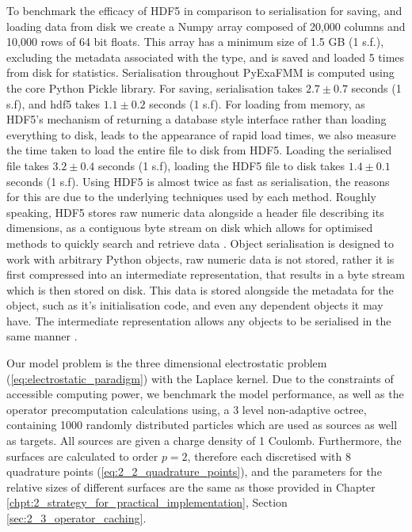 To benchmark the efficacy of HDF5 in comparison to serialisation for saving,
and loading data from disk we create a Numpy array composed of
20,000 columns and 10,000 rows of 64 bit floats. This array has a minimum size
of 1.5 GB (1 s.f.), excluding the metadata associated with the type, and is
saved and loaded 5 times from disk for statistics. Serialisation throughout
\gls{PyExaFMM} is computed using the core Python Pickle library. For saving,
serialisation takes $2.7 \pm 0.7$ seconds (1 s.f), and hdf5 takes $1.1 ± 0.2$ seconds (1 s.f).
For loading from memory, as HDF5's mechanism of returning a database style interface
rather than loading everything to disk, leads to the appearance of rapid
load times, we also measure the time taken to load the entire file to disk from
HDF5. Loading the serialised file takes $3.2 \pm 0.4$ seconds (1 s.f), loading
the HDF5 file to disk takes $1.4 \pm 0.1$ seconds (1 s.f). Using HDF5 is almost
twice as fast as serialisation, the reasons for this are due to the underlying
techniques used by each method. Roughly speaking, HDF5 stores raw numeric data
alongside a header file describing its dimensions, as a contiguous byte stream
on disk which allows for optimised methods to quickly search and retrieve data
\cite{collette2013python}. Object serialisation is designed to work with arbitrary
Python objects, raw numeric data is not stored, rather it is first compressed
into an intermediate representation, that results in a byte stream which is then
stored on disk. This data is stored alongside the metadata for the object, such
as it's initialisation code, and even any dependent objects it may have. The
intermediate representation allows any objects to be serialised in the same
manner \cite{pickle}.

Our model problem is the three dimensional electrostatic problem (\ref{eq:electrostatic_paradigm})
with the Laplace kernel. Due to the constraints of accessible computing power,
we benchmark the model performance, as well as the operator precomputation
calculations using, a 3 level non-adaptive octree, containing 1000 randomly distributed
particles which are used as sources as well as targets. All sources are given a
charge density of 1 Coulomb. Furthermore, the surfaces are calculated to order
$p=2$, therefore each discretised with $8$ quadrature points (\ref{eq:2_2_quadrature_points}), and the
parameters for the relative sizes of different surfaces are the same as those
provided in Chapter \ref{chpt:2_strategy_for_practical_implementation}, Section
\ref{sec:2_3_operator_caching}.

